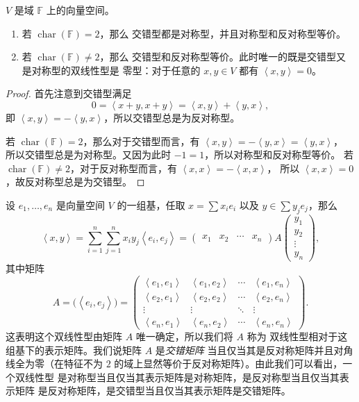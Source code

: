\documentclass[fontset=none,zihao=-4]{Notes}
\DeclareMathOperator\cha{char}
\newcommand{\inn}[1]{\left\langle#1\right\rangle}
\begin{document}
\begin{theorem}
  $V$ 是域 $\mathbb{F}$ 上的向量空间。
  \begin{enumerate}
    \item 若 $\cha(\mathbb{F})=2$，那么
    交错型都是对称型，并且对称型和反对称型等价。
    \item 若 $\cha(\mathbb{F})\neq 2$，那么
    交错型和反对称型等价。此时唯一的既是交错型又是对称型的双线性型是
    零型：对于任意的 $x,y\in V$ 都有 $\inn{x,y}=0$。
  \end{enumerate}
\end{theorem}
\begin{proof}
  首先注意到交错型满足
  \[
    0=\inn{x+y,x+y}=\inn{x,y}+\inn{y,x},  
  \]
  即 $\inn{x,y}=-\inn{y,x}$，所以交错型总是为反对称型。

  若 $\cha(\mathbb{F})=2$，那么对于交错型而言，有 $\inn{x,y}=-\inn{y,x}=\inn{y,x}$，
  所以交错型总是为对称型。又因为此时 $-1=1$，所以对称型和反对称型等价。
  若 $\cha(\mathbb{F})\neq 2$，对于反对称型而言，有 $\inn{x,x}=-\inn{x,x}$，
  所以 $\inn{x,x}=0$，故反对称型总是为交错型。
\end{proof}

设 $e_1,\dots,e_n$ 是向量空间 $V$ 的一组基，任取 $x=\sum x_ie_i$ 以及
$y\in\sum y_je_j$，那么
\[
  \inn{x,y}=\sum_{i=1}^n\sum_{j=1}^n x_iy_j\inn{e_i,e_j}
  =
  \begin{pmatrix}
    x_1 & x_2 & \cdots & x_n
  \end{pmatrix}A
  \begin{pmatrix}
    y_1 \\ y_2 \\ \vdots \\ y_n
  \end{pmatrix},
\]
其中矩阵
\[
  A=\bigl(\inn{e_i,e_j}\bigr)=\begin{pmatrix}
    \inn{e_1,e_1} & \inn{e_1,e_2} & \cdots & \inn{e_1,e_n} \\
    \inn{e_2,e_1} & \inn{e_2,e_2} & \cdots & \inn{e_2,e_n} \\
    \vdots & \vdots & \ddots & \vdots \\
    \inn{e_n,e_1} & \inn{e_n,e_2} & \cdots & \inn{e_n,e_n}
  \end{pmatrix}  .
\]
这表明这个双线性型由矩阵 $A$ 唯一确定，所以我们将 $A$ 称为
双线性型相对于这组基下的表示矩阵。我们说矩阵 $A$ 是\emph{交错矩阵}
当且仅当其是反对称矩阵并且对角线全为零（在特征不为 $2$ 的域上显然等价于反对称矩阵）。由此我们可以看出，一个双线性型
是对称型当且仅当其表示矩阵是对称矩阵，是反对称型当且仅当其表示矩阵
是反对称矩阵，是交错型当且仅当其表示矩阵是交错矩阵。
\end{document}
